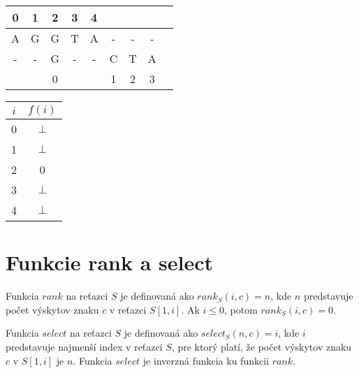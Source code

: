 \begin{example}
        \begin{minipage}{2.5in}
            \begin{tabular}{ c c c c c c c c c }
                0 & 1 & 2 & 3 & 4 &           \\ \hline     
                A & G & G & T & A & - & - & - \\
                - & - & G & - & - & C & T & A \\ \hline
                  &   & 0 &   &   & 1 & 2 & 3 \\   
            \end{tabular}
        \end{minipage}
        \begin{minipage}{2.5in}
            \begin{tabular}{ | c | c | }
                \hline            
                $i$ & $f(i)$ \\ \hline             
                0   & $\bot$ \\ \hline 
                1   & $\bot$ \\ \hline
                2   & 0      \\ \hline
                3   & $\bot$ \\ \hline
                4   & $\bot$ \\ \hline
            \end{tabular}
        \end{minipage}        
    \end{example}
    
\bigskip
    

\section{Funkcie rank a select}
\begin{defn}
    Funkcia $rank$ na reťazci $S$ je definovaná ako $rank_S(i, c) = n$, kde $n$
    predstavuje počet výskytov znaku $c$ v reťazci $S[1, i]$. Ak $i \leq 0$,
    potom $rank_S(i, c) = 0$.
\end{defn}

\begin{defn}
    Funkcia $select$ na reťazci $S$ je definovaná ako $select_S(n, c) = i$, kde
    $i$ predstavuje najmenší index v reťazci $S$, pre ktorý platí, že počet
    výskytov znaku $c$ v $S[1, i]$ je $n$. Funkcia $select$ je inverzná funkcia
    ku funkcii $rank$.
\end{defn}


